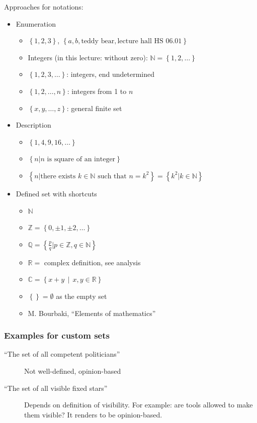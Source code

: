 \documentclass[a4paper,landscape,twocolumn]{article}
\newcommand\set[1]{\left\{#1\right\}}
\newcommand\setdef[2]{\left\{#1\,\middle|\,#2\right\}}
\begin{document}
Approaches for notations:
\begin{itemize}
  \item Enumeration
    \begin{itemize}
      \item $\set{1,2, 3}$, $\set{a, b, \text{teddy bear}, \text{lecture hall HS 06.01}}$
      \item Integers (in this lecture: without zero): $\mathbb{N} = \set{1, 2, \ldots}$
      \item $\set{1, 2, 3, \ldots}$: integers, end undetermined
      \item $\set{1, 2, \ldots, n}$: integers from 1 to $n$
      \item $\set{x, y, \ldots, z}$: general finite set
    \end{itemize}
  \item Description
    \begin{itemize}
      \item $\set{1, 4, 9, 16, \ldots}$
      \item $\set{n | n \text{ is square of an integer}}$
      \item $\set{n | \text{there exists } k \in \mathbb{N} \text{ such that } n = k^2} = \set{k^2 | k \in \mathbb{N}}$
    \end{itemize}
  \item Defined set with shortcuts
    \begin{itemize}
      \item $\mathbb{N}$
      \item $\mathbb{Z} = \set{0, \pm 1, \pm 2, \ldots}$
      \item $\mathbb{Q} = \set{\frac{p}{q} | p \in \mathbb{Z}, q \in \mathbb{N}}$
      \item $\mathbb{R} = $ complex definition, see analysis
      \item $\mathbb{C} = \setdef{x + y}{x, y \in \mathbb{R}}$
      \item $\set{} = \emptyset$ as the empty set
      \item M. Bourbaki, \enquote{Elements of mathematics}
    \end{itemize}
\end{itemize}

\subsubsection{Examples for custom sets}

\begin{description}
  \item[\enquote{The set of all competent politicians}]
    Not well-defined, opinion-based
  \item[\enquote{The set of all visible fixed stars}]
    Depends on definition of visibility. For example: are tools allowed to make them visible?
    It renders to be opinion-based.
\end{description}
\end{document}
